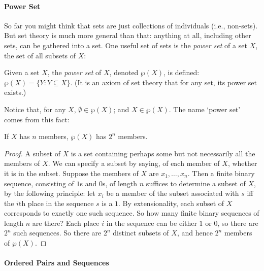 \paragraph{Power Set}

So far you might think that sets are just collections of individuals (i.e., non-sets). But set theory is much more general than that: anything at all, including other sets, can be gathered into a set.
One useful set of sets is the \emph{power set} of a set $X$, the set of all subsets of $X$:
 \begin{definition}Given a set $X$, the {\em power set} of $X$, denoted $\wp(X)$, is
defined: $\wp(X) = \{Y: Y \subseteq X\}$. (It is an axiom of set theory that for any set, its power set exists.)\end{definition} 
Notice that, for any $X$, $\emptyset \in \wp(X)$; and $X \in \wp(X)$. The name `power set' comes from this fact: 
\begin{theorem} If $X$ has $n$ members, $\wp(X)$ has $2^{n}$ members.
	\begin{proof}
		A subset of $X$ is a set containing perhaps some but not necessarily all the members of $X$. We can specify a subset by saying, of each member of $X$, whether it is in the subset.  Suppose the members of $X$ are $x_{1},\ldots,x_{n}$. Then a finite binary sequence, consisting of $1$s and $0$s, of length $n$ suffices to determine a subset of $X$, by the following principle: let $x_{i}$ be a member of the subset associated with $s$ iff the $i$th place in the sequence $s$ is a $1$. By extensionality, each subset of $X$ corresponds to exactly one such sequence. So how many finite binary sequences of length $n$ are there? Each place $i$ in the sequence can be either $1$ or $0$, so there are $2^{n}$ such sequences. So there are $2^n$ distinct subsets of $X$, and hence $2^{n}$ members of $\wp(X)$. 
	\end{proof}
 \end{theorem}

\paragraph{Ordered Pairs and Sequences}

